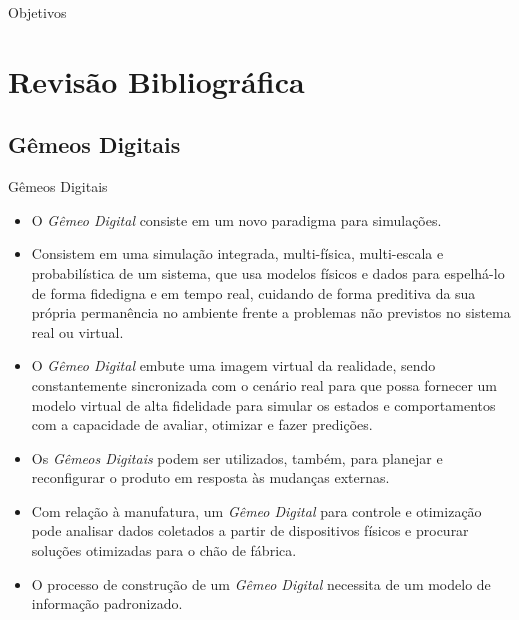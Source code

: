 \documentclass[aspectratio=169]{beamer}
\begin{document}
{\begin{frame}{Objetivos}
\begin{itemize}
  \end{itemize}

\end{frame}


\section{Revisão Bibliográfica}


\subsection{Gêmeos Digitais}

\begin{frame}{Gêmeos Digitais}

  \begin{itemize}
    \item {
      O \emph{Gêmeo Digital} consiste em um novo paradigma para 
      simula\c c\~oes.
    }
    \item {
      Consistem em uma simulação integrada, multi-física, multi-escala e 
      probabilística de um sistema, que usa modelos físicos e dados para
      espelhá-lo de forma fidedigna e em tempo real, cuidando de forma 
      preditiva da sua própria permanência no ambiente frente a problemas 
      não previstos no sistema real ou virtual.
    }
    \item {
      O \emph{Gêmeo Digital} embute uma imagem virtual da realidade, 
      sendo constantemente sincronizada com o cen\'ario real para que 
      possa fornecer um modelo virtual de alta fidelidade para simular 
      os estados e comportamentos com a capacidade de avaliar, otimizar 
      e fazer predi\c c\~oes.
    }
    \item {
      Os \emph{Gêmeos Digitais} podem ser utilizados, tamb\'em, para 
      planejar e reconfigurar o produto em resposta \`as mudan\c cas 
      externas.
    }
    \item {
      Com rela\c c\~ao \`a manufatura, um \emph{Gêmeo Digital} para 
      controle e otimiza\c c\~ao pode analisar dados coletados a partir de 
      dispositivos f\'isicos e procurar solu\c c\~oes otimizadas para o 
      ch\~ao de f\'abrica.
    }
    \item {
      O processo de constru\c c\~ao de um \emph{Gêmeo Digital} necessita 
      de um modelo de informa\c c\~ao padronizado.
    }
  \end{itemize}

\end{frame}  


}
\end{document}
